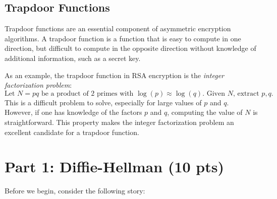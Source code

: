 \documentclass{article}
\begin{document}
\subsection*{Trapdoor Functions}
    
    Trapdoor functions are an essential component of asymmetric encryption algorithms. A trapdoor function is a function that is easy to compute in one direction, but difficult to compute in the opposite direction without knowledge of additional information, such as a secret key.
    
    \vspace{2mm}
    As an example, the trapdoor function in RSA encryption is the \textit{integer factorization problem}: $$\text{Let $N = pq$ be a product of 2 primes with $\log(p) \approx \log(q)$. Given $N$, extract $p, q$.}$$ This is a difficult problem to solve, especially for large values of $p$ and $q$. However, if one has knowledge of the factors $p$ and $q$, computing the value of $N$ is straightforward. This property makes the integer factorization problem an excellent candidate for a trapdoor function.

\section*{Part 1: Diffie-Hellman (10 pts)}
    Before we begin, consider the following story:
    
\end{document}
